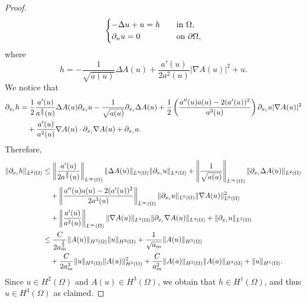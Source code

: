\documentclass[10pt,a4paper]{amsart}
\def\n{\textbf{\textit{n}}}
\def\u{u}
\begin{document}
\begin{proof}
\begin{equation}
\begin{cases}
-\Delta \u+ \u = h \quad &\text{in }\Omega,\\
\partial_{\n} \u=0\quad &\text{on }\partial\Omega,
\end{cases}
\end{equation}
where
$$
h=- \frac{1}{\sqrt{a(u)}} \Delta A(u) + \frac{a'(u)}{2 a^2(u)} | \nabla A(u)|^2 +u.
$$
We notice that
\begin{align}
\partial_{x_i} h
&= \frac12 \frac{a'(u)}{a^\frac32 (u)} \Delta A(u) \partial_{x_i} u
- \frac{1}{\sqrt{a(u)}} \partial_{x_i} \Delta A(u)
+\frac12 \left( \frac{a''(u)a(u)- 2 (a'(u))^2}{a^3(u)} \right)  \partial_{x_i} u   | \nabla A(u)|^2
\notag
\\
&\quad + \frac{a'(u)}{a^2(u)} \nabla A(u) \cdot \partial_{x_i} \nabla A(u)
+ \partial_{x_i} u.
\label{h1}
\end{align}
Therefore, 
\begin{align}
\|\partial_{x_i} h\|_{L^2(\Omega)}
&\leq \left\|\frac{a'(u)}{2a^\frac32 (u)}\right\|_{L^\infty(\Omega)}\| \Delta A(u)\|_{L^4(\Omega)}\| \partial_{x_i} u\|_{L^4(\Omega)}
+ \left\|\frac{1}{\sqrt{a(u)}}\right\|_{L^\infty(\Omega)}\| \partial_{x_i}\Delta A(u)\|_{L^2(\Omega)}
\notag
\\
&\quad+\left\|\frac{a''(u)a(u)- 2 (a'(u))^2}{2a^3(u)} \right\|_{L^\infty(\Omega)}\|  \partial_{x_i} u\|_{L^6(\Omega)}\| \nabla A(u)\|_{L^6(\Omega)}^2
\notag
\\
&\quad  +\left\|\frac{a'(u)}{a^2(u)}\right\|_{L^\infty(\Omega)}\| \nabla A(u)\|_{L^4(\Omega)} \|\partial_{x_i} \nabla A(u)\|_{L^4(\Omega)}
+ \|\partial_{x_i} u\|_{L^2(\Omega)}
\notag
\\
& \leq
\frac{C}{2a_m^\frac32}\|A(u)\|_{H^3(\Omega)}\| u\|_{H^2(\Omega)}
+ \frac{1}{\sqrt{a_m}}\|A(u)\|_{H^3(\Omega)}
\notag
\\
&\quad+\frac{C}{2a_m^3}\|u\|_{H^2(\Omega)}\|A(u)\|_{H^2(\Omega)}^2
  +\frac{C}{a_m^2}\|A(u)\|_{H^2(\Omega)}\|A(u)\|_{H^3(\Omega)}
+ \|u\|_{H^1(\Omega)}.
\label{h2}
\end{align}
Since $u \in H^2(\Omega)$ and $A(u) \in H^3(\Omega)$, we obtain that $h \in H^1(\Omega)$, and thus $\u\in H^3(\Omega)$ as claimed.
\end{proof}
\end{document}
